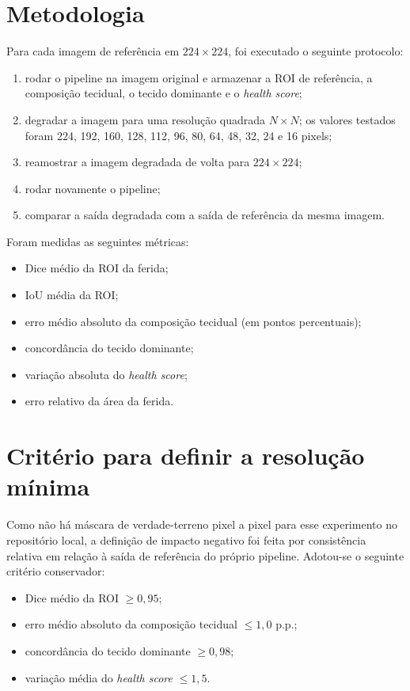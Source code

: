 \documentclass[
    12pt,
    openright,
    oneside,
    a4paper,
    chapter=TITLE,
    section=TITLE,
    brazil,
    sumario=tradicional,
    hidelinks
]{abntex2}
\begin{document}
\section{Metodologia}
Para cada imagem de referência em \(224 \times 224\), foi executado o seguinte protocolo:
\begin{enumerate}
    \item rodar o pipeline na imagem original e armazenar a ROI de referência, a composição tecidual, o tecido dominante e o \textit{health score};
    \item degradar a imagem para uma resolução quadrada \(N \times N\); os valores testados foram 224, 192, 160, 128, 112, 96, 80, 64, 48, 32, 24 e 16 pixels;
    \item reamostrar a imagem degradada de volta para \(224 \times 224\);
    \item rodar novamente o pipeline;
    \item comparar a saída degradada com a saída de referência da mesma imagem.
\end{enumerate}

Foram medidas as seguintes métricas:
\begin{itemize}
    \item Dice médio da ROI da ferida;
    \item IoU média da ROI;
    \item erro médio absoluto da composição tecidual (em pontos percentuais);
    \item concordância do tecido dominante;
    \item variação absoluta do \textit{health score};
    \item erro relativo da área da ferida.
\end{itemize}

\section{Critério para definir a resolução mínima}
Como não há máscara de verdade-terreno pixel a pixel para esse experimento no repositório local, a definição de impacto negativo foi feita por consistência relativa em relação à saída de referência do próprio pipeline. Adotou-se o seguinte critério conservador:
\begin{itemize}
    \item Dice médio da ROI \(\geq 0{,}95\);
    \item erro médio absoluto da composição tecidual \(\leq 1{,}0\) p.p.;
    \item concordância do tecido dominante \(\geq 0{,}98\);
    \item variação média do \textit{health score} \(\leq 1{,}5\).
\end{itemize}
\end{document}
